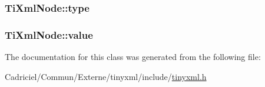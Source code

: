 \hypertarget{class_ti_xml_node_a2619c6379181c16ba95ae6922e2ca839}{
\subsubsection[{type}]{ Ti\-Xml\-Node\-::type\hspace{0.3cm}{\ttfamily [protected]}}}\label{class_ti_xml_node_a2619c6379181c16ba95ae6922e2ca839}
\hypertarget{class_ti_xml_node_aead528b3cedc33c16a6c539872c7cc8b}{
\subsubsection[{value}]{ Ti\-Xml\-Node\-::value\hspace{0.3cm}{\ttfamily [protected]}}}\label{class_ti_xml_node_aead528b3cedc33c16a6c539872c7cc8b}


The documentation for this class was generated from the following file\-:\begin{DoxyCompactItemize}
\item 
Cadriciel/\-Commun/\-Externe/tinyxml/include/\hyperlink{tinyxml_8h}{tinyxml.\-h}\end{DoxyCompactItemize}
